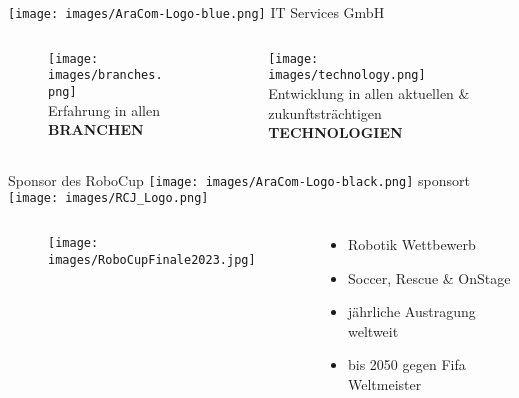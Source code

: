 \documentclass[aspectratio=169]{beamer}
\begin{document}
\begin{frame}{\texttt{[image: images/AraCom-Logo-blue.png]} IT Services GmbH}
{\begin{columns}
\begin{column}{0.20\textwidth}
\begin{figure}
        \centering
        \texttt{[image: images/branches.png]}\\
        Erfahrung in allen\\\textbf{BRANCHEN}\newline\newline
      \end{figure}
    \end{column}
    \begin{column}{0.20\textwidth}
      \begin{figure}
        \centering
        \texttt{[image: images/technology.png]}\\
        Entwicklung in allen aktuellen \& zukunftsträchtigen\\
        \textbf{TECHNOLOGIEN}
      \end{figure}
    \end{column}
  \end{columns}
  }
\end{frame}

\begin{frame}{Sponsor des RoboCup}
  \texttt{[image: images/AraCom-Logo-black.png]} sponsort
  \texttt{[image: images/RCJ\_Logo.png]}
  \begin{columns}
    \begin{column}{0.45\textwidth}
      \begin{figure}[h]
        \centering
        \texttt{[image: images/RoboCupFinale2023.jpg]}
      \end{figure}
    \end{column}
    \begin{column}{0.45\textwidth}
      \begin{itemize}
        \item Robotik Wettbewerb
        \item Soccer, Rescue \& OnStage
        \item jährliche Austragung weltweit
        \item bis 2050 gegen Fifa Weltmeister
      \end{itemize}
    \end{column}
  \end{columns}
\end{frame}
\end{document}
